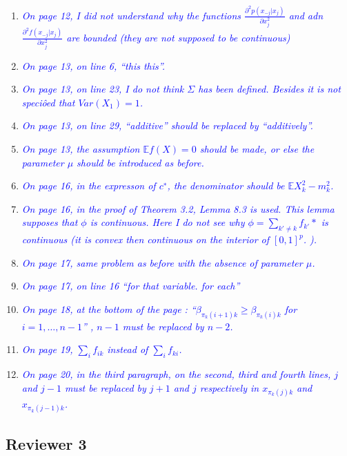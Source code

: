 \documentclass[pdftex,12pt]{article}
\def\E{{\mathbb E}}
\def\reviewercomment#1{{\it\textcolor{blue}{#1}}\smallskip}
\begin{document}
\begin{enumerate}
\item \reviewercomment{On page 12, I did not understand why the functions 
$\frac{\partial^2 p(x_{-j} |  x_j)}{\partial x_j^2}$
and adn 
$\frac{\partial^2 f(x_{-j} |  x_j)}{\partial x_j^2}$
are bounded (they are not supposed to be continuous)}

\item \reviewercomment{On page 13, on line 6, ``this this''.}

\item \reviewercomment{On page 13, on line 23, I do not think $\Sigma$ has been defined. Besides it
is not speciôed that $Var(X_1) = 1$.}
\item \reviewercomment{On page 13, on line 29, ``additive'' should be replaced by
``additively''.}
\item \reviewercomment{On page 13, the assumption $\E f(X) = 0$ should be made, or else the
parameter $\mu$ should be introduced as before.}
\item \reviewercomment{On page 16, in the expresson of $c^∗$, the
  denominator should be $\E X_k^2 −m_k^2$.}
\item \reviewercomment{On page 16, in the proof of Theorem 3.2, Lemma 8.3 is used. This
lemma supposes that $\phi$ is continuous. Here I do not see why $\phi =
\sum_{k'\neq k} f_{k'}*$ is continuous (it is convex then continuous on the interior of
$[0,1]^p$. ).}
\item \reviewercomment{On page 17, same problem as before with the absence of parameter $\mu$.}
\item \reviewercomment{On page 17, on line 16 ``for that variable. for each''}
\item \reviewercomment{On page 18, at the bottom of the page :
  ``$\beta_{\pi_k(i+1)k} 
\geq \beta_{\pi_k(i)k}$ for $i=1,\ldots, n-1$'' , $n−1$ must be replaced by $n−2$.}
\item \reviewercomment{On page 19, $\sum_{i} f_{ik}$ instead of $\sum_i
  f_{ki}$.}
\item \reviewercomment{On page 20, in the third paragraph, on the second, third and fourth
lines, $j$ and $j − 1$ must be replaced by $j + 1$ and $j$ respectively in
$x_{\pi_k(j)k}$ and $x_{\pi_k(j-1)k}$.}

\end{enumerate}

\subsection*{Reviewer 3}
\end{document}
